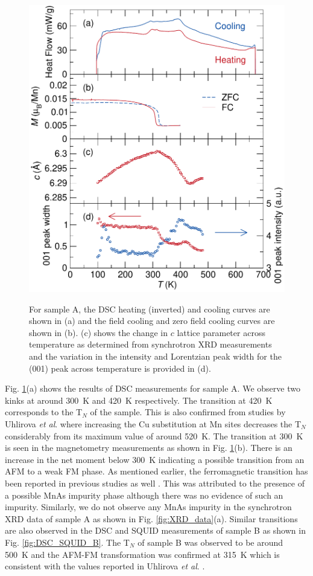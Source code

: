 \documentclass[letterpaper,10pt,doublespacing,edeposit]{uiucthesis2020}
\begin{document}
\begin{mainmatter}
\begin{figure}
\centering\includegraphics[width=0.8\columnwidth]{figures/ch7/sampleA_DSC_squid_11BM_cropped.pdf} \\
\caption{\label{fig:sampleA_transitions}
For sample A, the DSC heating (inverted) and cooling curves are shown in (a) and the field cooling and zero field cooling curves are shown in (b). (c) shows the change in $c$ lattice parameter across temperature as determined from synchrotron XRD measurements and the variation in the intensity and Lorentzian peak width for the (001) peak across temperature is provided in (d).
} 
\end{figure}


Fig. \ref{fig:sampleA_transitions}(a) shows the results of DSC measurements for sample A. We observe two kinks at around 300~K and 420~K respectively. The transition at 420~K corresponds to the T$_N$ of the sample. This is also confirmed from studies by Uhlirova \emph{et al}.\cite{Uhlirova2019} where increasing the Cu substitution at Mn sites decreases the T$_N$ considerably from its maximum value of around 520~K. The transition at 300~K is seen in the magnetometry measurements as shown in Fig. \ref{fig:sampleA_transitions}(b). There is an increase in the net moment below 300~K indicating a possible transition from an AFM to a weak FM phase. As mentioned earlier, the ferromagnetic transition has been reported in previous studies as well \cite{Nateprov2011,Uhlirova2019}. This was attributed to the presence of a possible MnAs impurity phase although there was no evidence of such an impurity. Similarly, we do not observe any MnAs impurity in the synchrotron XRD data of sample A as shown in Fig. \ref{fig:XRD_data}(a). Similar transitions are also observed in the DSC and SQUID measurements of sample B as shown in Fig. \ref{fig:DSC_SQUID_B}. The T$_N$ of sample B was observed to be around 500~K and the AFM-FM transformation was confirmed at 315~K which is consistent with the values reported in Uhlirova \emph{et al}. \cite{Uhlirova2019}.


\end{mainmatter}
\end{document}
